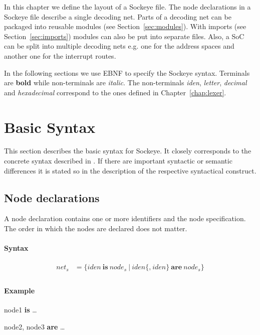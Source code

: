 \documentclass[a4paper,11pt,twoside]{report}
\begin{document}
{{{In this chapter we define the layout of a Sockeye file.
The node declarations in a Sockeye file describe a single decoding net.
Parts of a decoding net can be packaged into reusable modules (see Section~\ref{sec:modules}).
With imports (see Section~\ref{sec:imports}) modules can also be put into separate files.
Also, a SoC can be split into multiple decoding nets e.g. one for the address spaces and another one for the interrupt routes.

In the following sections we use EBNF to specify the Sockeye syntax. Terminals are \textbf{bold} while non-terminals are \textit{italic}.
The non-terminals \textit{iden}, \textit{letter}, \textit{decimal} and \textit{hexadecimal} correspond to the ones defined in Chapter~\ref{chap:lexer}.

\section{Basic Syntax}
This section describes the basic syntax for Sockeye.
It closely corresponds to the concrete syntax described in \cite{achermann:mars17}.
If there are important syntactic or semantic differences it is stated so in the description of the respective syntactical construct.

\subsection{Node declarations}
A node declaration contains one or more identifiers and the node specification.
The order in which the nodes are declared does not matter.

\paragraph{Syntax}
\begin{align*}
\textit{net}_s & \mathop{=}
    \Big\{
        \textit{iden}\ \textbf{is}\ \textit{node}_s\
    \Big|\
        \textit{iden}\bigl\{\textbf{,}\ \textit{iden}\bigr\}\ \textbf{are}\ \textit{node}_s
    \Big\} \\
\end{align*}

\clearpage
\paragraph{Example}
\begin{syntax}
    node1 \textbf{is} \ldots

    node2,
    node3 \textbf{are} \ldots
\end{syntax}

}}}
\end{document}
